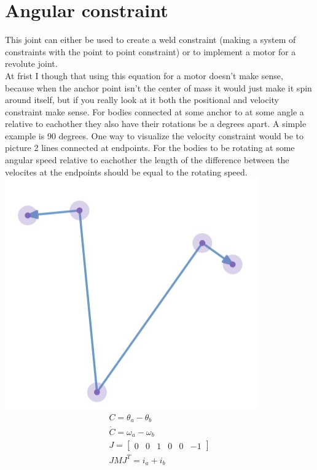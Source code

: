 \documentclass{article}
\begin{document}
\section*{Angular constraint}
This joint can either be used to create a weld constraint (making a system of constraints with the point to point constraint) or to implement a motor for a revolute joint. \\
At frist I though that using this equation for a motor doesn't make sense, because when the anchor point isn't the center of mass it would just make it spin around itself, but if you really look at it both the positional and velocity constraint make sense. For bodies connected at some anchor to at some angle a relative to eachother they also have their rotations be a degrees apart. A simple example is 90 degrees. One way to visualize the velocity constraint would be to picture 2 lines connected at endpoints. For the bodies to be rotating at some angular speed relative to eachother the length of the difference between the velocites at the endpoints should be equal to the rotating speed.
\includegraphics{angular_constraint.jpg}
\begin{gather}
C = \theta_a - \theta_b \\
\dot C = \omega_a - \omega_b \\
J = \begin{bmatrix}0 & 0 & 1 & 0 & 0 & -1\end{bmatrix} \\
JMJ^T = i_a + i_b
\end{gather}
\end{document}
